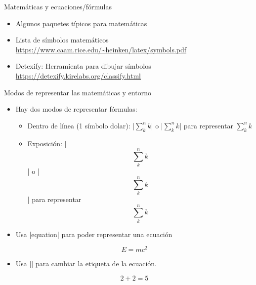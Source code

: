 \begin{frame}[fragile]{Matemáticas y ecuaciones/fórmulas}
  \begin{itemize}
    \item Algunos paquetes típicos para matemáticas
          \begin{latexcode}
            \usepackage{amsmath}
            \usepackage{amssymb}
            \usepackage{amsfonts}
            \usepackage{mathrsfs}
            \usepackage{latexsym}
          \end{latexcode}
    \item Lista de símbolos matemáticos \url{https://www.caam.rice.edu/~heinken/latex/symbols.pdf}
    \item Detexify: Herramienta para dibujar símbolos
    \url{https://detexify.kirelabs.org/classify.html}
  \end{itemize}
\end{frame}

\begin{frame}[fragile]{Modos de representar las matemáticas y entorno}
  \begin{itemize}
    \item Hay dos modos de representar fórmulas:
          \begin{itemize}
            \item  Dentro de línea (1 símbolo dolar): \latexinline|$\sum_k^n k$| o \latexinline|\(\sum_k^n k\)| para representar \(\sum_k^n k\)
            \item Exposición: \latexinline|$$\sum_k^n k$$| o \latexinline|\[\sum_k^n k\]| para representar
                  \[\sum_k^n k\]
          \end{itemize}
    \item Usa \latexinline|equation| para poder representar una ecuación
          \begin{latexexample}
            \begin{equation}
              E = mc^2
            \end{equation}
          \end{latexexample}
    \item Usa \latexinline|\tag| para cambiar la etiqueta de la ecuación.
          \begin{latexexample}
            \begin{equation}
              2 + 2 = 5 \tag{verdad}
            \end{equation}
          \end{latexexample}
  \end{itemize}
\end{frame}

